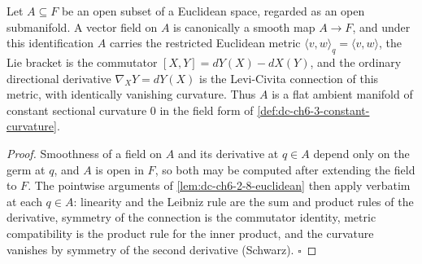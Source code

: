 \begin{lemma}
  \label{lem:dc-ch6-2-8-euclidean-opens}
  \leanok
  Let $A\subseteq F$ be an open subset of a Euclidean space, regarded as an
  open submanifold. A vector field on $A$ is canonically a smooth map
  $A\to F$, and under this identification $A$ carries the restricted Euclidean
  metric $\langle v,w\rangle_q=\langle v,w\rangle$, the Lie bracket is the
  commutator $[X,Y]=dY(X)-dX(Y)$, and the ordinary directional derivative
  $\nabla_XY=dY(X)$ is the Levi-Civita connection of this metric, with
  identically vanishing curvature. Thus $A$ is a flat ambient manifold of
  constant sectional curvature $0$ in the field form of
  \cref{def:dc-ch6-3-constant-curvature}.
\end{lemma}
\begin{proof}
  \leanok
  Smoothness of a field on $A$ and its derivative at $q\in A$ depend only on
  the germ at $q$, and $A$ is open in $F$, so both may be computed after
  extending the field to $F$. The pointwise arguments of
  \cref{lem:dc-ch6-2-8-euclidean} then apply verbatim at each $q\in A$:
  linearity and the Leibniz rule are the sum and product rules of the
  derivative, symmetry of the connection is the commutator identity, metric
  compatibility is the product rule for the inner product, and the curvature
  vanishes by symmetry of the second derivative (Schwarz). $\square$
\end{proof}

